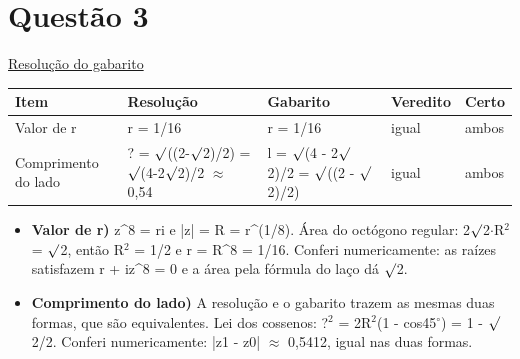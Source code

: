 \documentclass{article}%
\begin{document}
\section*{Questão 3}%
\href{https://poliedroresolve.sistemapoliedro.com.br/vestibulares/ita/2027/ita-2-fase-dia-1-20-10-2026-2-fase-dia-1/dissertativa-3-matematica-2-fase-dia-1-ita-2027}{Resolução do gabarito}\par\smallskip%
\begin{longtable}{@{}p{} p{} p{} p{} p{}@{}}\toprule Item & Resolução & Gabarito & Veredito & Certo \\ \midrule
Valor de r & r = 1/16 & r = 1/16 & igual & ambos \\
Comprimento do lado & ? = $\surd$((2-$\surd$2)/2) = $\surd$(4-2$\surd$2)/2 $\approx$ 0,54 & l = $\surd$(4 - 2$\surd$2)/2 = $\surd$((2 - $\surd$2)/2) & igual & ambos \\
\bottomrule\end{longtable}%
\begin{itemize}%
\item%
\textbf{Valor de r)} z\^{}8 = ri e |z| = R = r\^{}(1/8). Área do octógono regular: 2$\surd$2$\cdot$R$^2$ = $\surd$2, então R$^2$ = 1/2 e r = R\^{}8 = 1/16. Conferi numericamente: as raízes satisfazem r + iz\^{}8 = 0 e a área pela fórmula do laço dá $\surd$2.%
\item%
\textbf{Comprimento do lado)} A resolução e o gabarito trazem as mesmas duas formas, que são equivalentes. Lei dos cossenos: ?$^2$ = 2R$^2$(1 - cos45$^\circ$) = 1 - $\surd$2/2. Conferi numericamente: |z1 - z0| $\approx$ 0,5412, igual nas duas formas.%
\end{itemize}%
\end{document}
